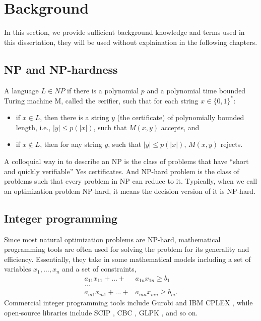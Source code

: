 \section{Background}
In this section, we provide sufficient background knowledge and terms used in this dissertation,
they will be used without explaination in the following chapters. 

\subsection{NP and NP-hardness}
\begin{definition}[NP]
    A language $L\in NP$ if there is a polynomial $p$ and a polynomial time bounded Turing machine M, 
    called the {\textit verifier}, such that for each string $x\in \{0, 1\}^*$: 
    \begin{itemize}
        \item if $x\in L$, then there is a string $y$ (the certificate) of polynomially bounded length, i.e., $|y| \leq p(|x|)$,
        such that $M(x, y)$ accepts, and 
        \item if $x\notin L$, then for any string $y$, such that $|y|\leq p(|x|)$, $M(x,y)$ rejects.
    \end{itemize}
\end{definition}

A colloquial way in \cite{vazirani2001approximation} to describe an NP is the class of problems that have ``short and quickly verifiable''
Yes certificates.
And NP-hard problem is the class of problems such that every problem in NP can reduce to it.
Typically, when we call an optimization problem NP-hard, it means the decision version of it is NP-hard.
\subsection{Integer programming}
Since most natural optimization problems are NP-hard, mathematical programming tools are often 
used for solving the problem for its generality and efficiency. Essentially, they take in
some mathematical models including a set of variables $x_1, \dots, x_n$ and a set of constraints,
\begin{align*}
    a_{11} x_{11} + \dots + & a_{1n} x_{1n} \geq b_1\\
    \dots & \\
    a_{m1} x_{m1} + \dots + & a_{mn} x_{mn} \geq b_m.
\end{align*}
Commercial integer programming tools include Gurobi \cite{optimization2019gurobi} and IBM CPLEX \cite{cplex2009v12}, while open-source 
libraries include SCIP \cite{achterberg2009scip}, CBC \cite{forrest2005cbc}, GLPK \cite{makhorin2008glpk}, and so on. 

